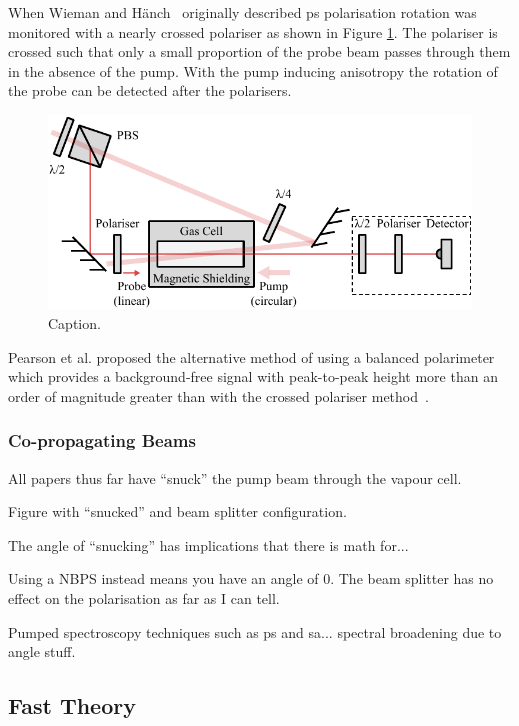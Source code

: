 When Wieman and H\"anch~\cite{wieman_doppler-free_1976} originally described \gls{ps} polarisation rotation was monitored with a nearly crossed polariser as shown in Figure \ref{figure:wieman_doppler-free_schematic}.
The polariser is crossed such that only a small proportion of the probe beam passes through them in the absence of the pump.
With the pump inducing anisotropy the rotation of the probe can be detected after the polarisers.

\begin{figure}
\center
\includegraphics{part1/Figs/PolSpecWieman.pdf}
\caption{Caption.}
\label{figure:wieman_doppler-free_schematic}
\end{figure}

Pearson et al. proposed the alternative method of using a balanced polarimeter which provides a background-free signal with peak-to-peak height more than an order of magnitude greater than with the crossed polariser method~\cite{pearman_polarization_2002}.

\subsubsection{Co-propagating Beams}

All papers thus far have ``snuck'' the pump beam through the vapour cell.

Figure with ``snucked'' and beam splitter configuration.

The angle of ``snucking'' has implications that there is math for...

Using a NBPS instead means you have an angle of 0.
The beam splitter has no effect on the polarisation as far as I can tell.

Pumped spectroscopy techniques such as \gls{ps} and \gls{sa}... spectral broadening due to angle stuff.

\subsection{Fast Theory}

